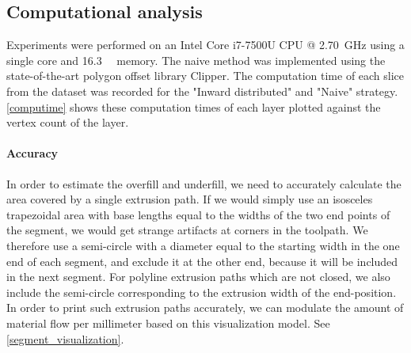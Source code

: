 \subsection{Computational analysis}
Experiments were performed on an Intel Core i7-7500U CPU @ \SI{2.70}{\giga\hertz} using a single core and \SI{16.3}{\giga\byte} memory.
The naive method was implemented using the state-of-the-art polygon offset library Clipper. \cite{johnson2014clipper}
The computation time of each slice from the dataset was recorded for the "Inward distributed" and "Naive" strategy. 
\cref{computime} shows these computation times of each layer plotted against the vertex count of the layer.

\paragraph{Accuracy}
In order to estimate the overfill and underfill, we need to accurately calculate the area covered by a single extrusion path.
If we would simply use an isosceles trapezoidal area with base lengths equal to the widths of the two end points of the segment, we would get strange artifacts at corners in the toolpath.
We therefore use a semi-circle with a diameter equal to the starting width in the one end of each segment, and exclude it at the other end, because it will be included in the next segment.
For polyline extrusion paths which are not closed, we also include the semi-circle corresponding to the extrusion width of the end-position.
In order to print such extrusion paths accurately, we can modulate the amount of material flow per millimeter based on this visualization model.
See \cref{segment_visualization}.

